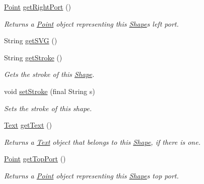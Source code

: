 \begin{DoxyCompactItemize}
\hyperlink{classcom_1_1aarrelaakso_1_1drawl_1_1_point}{Point} \hyperlink{classcom_1_1aarrelaakso_1_1drawl_1_1_shape_a319c78d425ec91e1aef1072a95e349ad}{get\+Right\+Port} ()
\begin{DoxyCompactList}\small\item\em Returns a \hyperlink{classcom_1_1aarrelaakso_1_1drawl_1_1_point}{Point} object representing this \hyperlink{classcom_1_1aarrelaakso_1_1drawl_1_1_shape}{Shape}\textquotesingle{}s left port. \end{DoxyCompactList}\item 
String \hyperlink{classcom_1_1aarrelaakso_1_1drawl_1_1_shape_aca74cc0c71117040f28329744eebde9d}{get\+S\+VG} ()
\item 
String \hyperlink{classcom_1_1aarrelaakso_1_1drawl_1_1_shape_a4e1d54c7e161e3af5053939ddefdf9e6}{get\+Stroke} ()
\begin{DoxyCompactList}\small\item\em Gets the stroke of this \hyperlink{classcom_1_1aarrelaakso_1_1drawl_1_1_shape}{Shape}. \end{DoxyCompactList}\item 
void \hyperlink{classcom_1_1aarrelaakso_1_1drawl_1_1_shape_a75685cbfea36858836df8e1fb4f8b821}{set\+Stroke} (final String s)
\begin{DoxyCompactList}\small\item\em Sets the stroke of this shape. \end{DoxyCompactList}\item 
\hyperlink{classcom_1_1aarrelaakso_1_1drawl_1_1_text}{Text} \hyperlink{classcom_1_1aarrelaakso_1_1drawl_1_1_shape_a6f876978d4102974fedc5b41c93c7b26}{get\+Text} ()
\begin{DoxyCompactList}\small\item\em Returns a \hyperlink{classcom_1_1aarrelaakso_1_1drawl_1_1_text}{Text} object that belongs to this \hyperlink{classcom_1_1aarrelaakso_1_1drawl_1_1_shape}{Shape}, if there is one. \end{DoxyCompactList}\item 
\hyperlink{classcom_1_1aarrelaakso_1_1drawl_1_1_point}{Point} \hyperlink{classcom_1_1aarrelaakso_1_1drawl_1_1_shape_aed4e9caa294aacc973b7a531a960e9e5}{get\+Top\+Port} ()
\begin{DoxyCompactList}\small\item\em Returns a \hyperlink{classcom_1_1aarrelaakso_1_1drawl_1_1_point}{Point} object representing this \hyperlink{classcom_1_1aarrelaakso_1_1drawl_1_1_shape}{Shape}\textquotesingle{}s top port. \end{DoxyCompactList}\item 

\end{DoxyCompactItemize}
